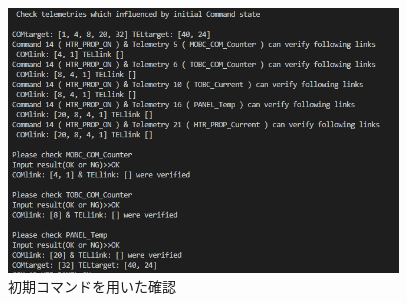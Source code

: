 \documentclass[11pt]{jsreport}
\begin{document}
\begin{figure}[H]
   \centering
      \includegraphics[height=7.0cm]{figure/COM14_TEL17_initial_COM.png}
      \caption{初期コマンドを用いた確認}
      \label{fig:ini_COM_phase}
\end{figure}
\end{document}
